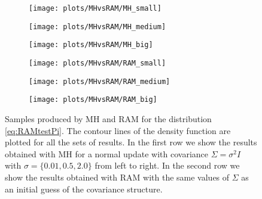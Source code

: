 \begin{figure}[t]
	\centering
	\begin{subfigure}{0.32\linewidth}
		\texttt{[image: plots/MHvsRAM/MH\_small]}
	\end{subfigure}
	\begin{subfigure}{0.32\linewidth}
		\texttt{[image: plots/MHvsRAM/MH\_medium]}
	\end{subfigure}
	\begin{subfigure}{0.32\linewidth}
		\texttt{[image: plots/MHvsRAM/MH\_big]}
	\end{subfigure}
	\begin{subfigure}{0.32\linewidth}
		\texttt{[image: plots/MHvsRAM/RAM\_small]}
	\end{subfigure}
	\begin{subfigure}{0.32\linewidth}
		\texttt{[image: plots/MHvsRAM/RAM\_medium]}
	\end{subfigure}
	\begin{subfigure}{0.32\linewidth}
		\texttt{[image: plots/MHvsRAM/RAM\_big]}
	\end{subfigure}
	\caption{Samples produced by MH and RAM for the distribution \eqref{eq:RAMtestPi}. The contour lines of the density function are plotted for all the sets of results. In the first row we show the results obtained with MH for a normal update with covariance $\Sigma = \sigma^2 I $ with $\sigma = \{0.01, 0.5, 2.0\}$ from left to right. In the second row we show the results obtained with RAM with the same values of $\Sigma$ as an initial guess of the covariance structure. }
	\label{fig:RAMexample}
\end{figure}
